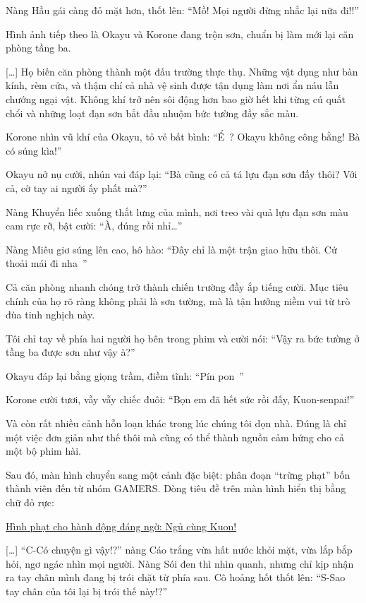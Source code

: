 \documentclass[../main.tex]{subfiles}
\begin{document}
Nàng Hầu gái càng đỏ mặt hơn, thốt lên: ``Mồ! Mọi người đừng nhắc lại nữa đi!!''

Hình ảnh tiếp theo là Okayu và Korone đang trộn sơn, chuẩn bị làm mới lại căn phòng tầng ba.

\il

[\dots] Họ biến căn phòng thành một đấu trường thực thụ. Những vật dụng như bàn kính, rèm cửa, và thậm chí cả nhà vệ sinh được tận dụng làm nơi ẩn náu lẫn chướng ngại vật. Không khí trở nên sôi động hơn bao giờ hết khi từng cú quất chổi và những loạt đạn sơn bắt đầu nhuộm bức tường đầy sắc màu.

Korone nhìn vũ khí của Okayu, tỏ vẻ bất bình: ``Ể~? Okayu không công bằng! Bà có súng kìa!''

Okayu nở nụ cười, nhún vai đáp lại: ``Bà cũng có cả tá lựu đạn sơn đấy thôi? Với cả, cờ tay ai người ấy phất mà?''

Nàng Khuyển liếc xuống thắt lưng của mình, nơi treo vài quả lựu đạn sơn màu cam rực rỡ, bật cười: ``À, đúng rồi nhỉ\dots''

Nàng Miêu giơ súng lên cao, hô hào: ``Đây chỉ là một trận giao hữu thôi. Cứ thoải mái đi nha~''

Cả căn phòng nhanh chóng trở thành chiến trường đầy ắp tiếng cười. Mục tiêu chính của họ rõ ràng không phải là sơn tường, mà là tận hưởng niềm vui từ trò đùa tinh nghịch này.

\il

Tôi chỉ tay về phía hai người họ bên trong phim và cười nói: ``Vậy ra bức tường ở tầng ba được sơn như vậy à?''

Okayu đáp lại bằng giọng trầm, điềm tĩnh: ``Pín pon~''

Korone cười tươi, vẫy vẫy chiếc đuôi: ``Bọn em đã hết sức rồi đấy, Kuon-senpai!''

Và còn rất nhiều cảnh hỗn loạn khác trong lúc chúng tôi dọn nhà. Đúng là chỉ một việc đơn giản như thế thôi mà cũng có thể thành nguồn cảm hứng cho cả một bộ phim hài.

Sau đó, màn hình chuyển sang một cảnh đặc biệt: phân đoạn ``trừng phạt'' bốn thành viên đến từ nhóm GAMERS. Dòng tiêu đề trên màn hình hiển thị bằng chữ đỏ rực:

\begin{center}
    \uline{Hình phạt cho hành động đáng ngờ: Ngủ cùng Kuon!}
\end{center}

\il

[\dots] ``C-Có chuyện gì vậy!?'' nàng Cáo trắng vừa hất nước khỏi mặt, vừa lắp bắp hỏi, ngơ ngác nhìn mọi người. Nàng Sói đen thì nhìn quanh, nhưng chỉ kịp nhận ra tay chân mình đang bị trói chặt từ phía sau. Cô hoảng hốt thốt lên: ``S-Sao tay chân của tôi lại bị trói thế này!?''
\end{document}
